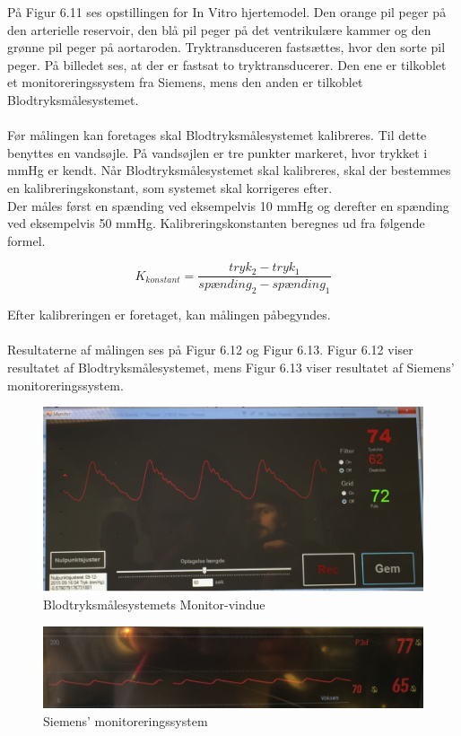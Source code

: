 På Figur 6.11 ses opstillingen for In Vitro hjertemodel. Den orange pil peger på den arterielle reservoir, den blå pil peger på det ventrikulære kammer og den grønne pil peger på aortaroden. Tryktransduceren fastsættes, hvor den sorte pil peger. På billedet ses, at der er fastsat to tryktransducerer. Den ene er tilkoblet et monitoreringssystem fra Siemens, mens den anden er tilkoblet Blodtryksmålesystemet.
\\\\
Før målingen kan foretages skal Blodtryksmålesystemet kalibreres. Til dette benyttes en vandsøjle. På vandsøjlen er tre punkter markeret, hvor trykket i mmHg er kendt. Når Blodtryksmålesystemet skal kalibreres, skal der bestemmes en kalibreringskonstant, som systemet skal korrigeres efter. \\
Der måles først en spænding ved eksempelvis 10 mmHg og derefter en spænding ved eksempelvis 50 mmHg. Kalibreringskonstanten beregnes ud fra følgende formel. 

\begin{equation}
	K_{konstant} = \frac{tryk_2 - tryk_1}{spænding_2 - spænding_1}
\end{equation}

Efter kalibreringen er foretaget, kan målingen påbegyndes. 
\\\\

Resultaterne af målingen ses på Figur 6.12 og Figur 6.13. Figur 6.12 viser resultatet af Blodtryksmålesystemet, mens Figur 6.13 viser resultatet af Siemens’ monitoreringssystem. 

\begin{figure}[H]
	\centering
	\includegraphics[width=1\textwidth]{Figurer/Snip20151214_99}
	\caption{Blodtryksmålesystemets Monitor-vindue}
\end{figure}

\begin{figure}[H]
	\centering
	\includegraphics[width=1\textwidth]{Figurer/Snip20151214_100}
	\caption{Siemens' monitoreringssystem}
\end{figure}

